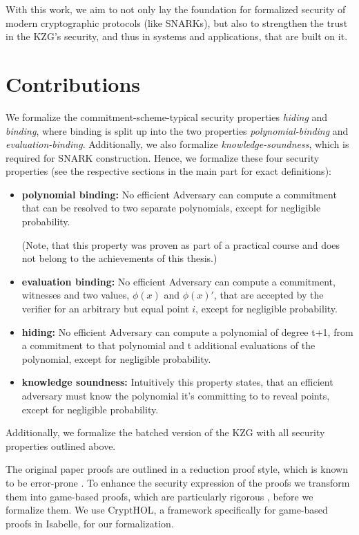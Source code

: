 With this work, we aim to not only lay the foundation for formalized security of modern cryptographic protocols (like SNARKs), but also to strengthen the trust in the KZG's security, and thus in systems and applications, that are built on it. 

\section{Contributions}

We formalize the commitment-scheme-typical security properties \textit{hiding} and \textit{binding}, where binding is split up into the two properties \textit{polynomial-binding} and \textit{evaluation-binding}. Additionally, we also formalize \textit{knowledge-soundness}, which is required for SNARK construction. Hence, we formalize these four security properties (see the respective sections in the main part for exact definitions):
\begin{itemize}
    \item \textbf{polynomial binding:}
    No efficient Adversary can compute a commitment that can be resolved to two separate polynomials, except for negligible probability.

    (Note, that this property was proven as part of a practical course and does not belong to the achievements of this thesis.)
    \item \textbf{evaluation binding:}
    No efficient Adversary can compute a commitment, witnesses and two values, $\phi(x)$ and $\phi(x)'$, that are accepted by the verifier for an arbitrary but equal point $i$, except for negligible probability.
    \item \textbf{hiding:}
    No efficient Adversary can compute a polynomial of degree t+1, from a commitment to that polynomial and t additional evaluations of the polynomial, except for negligible probability.
    \item \textbf{knowledge soundness:}
    Intuitively this property states, that an efficient adversary must know the polynomial it's committing to to reveal points, except for negligible probability. 
\end{itemize} 
Additionally, we formalize the batched version of the KZG with all security properties outlined above.  

The original paper proofs are outlined in a reduction proof style, which is known to be error-prone \parencite{gamesB&R}. To enhance the security expression of the proofs we transform them into game-based proofs, which are particularly rigorous \parencite{shoup_games, gamesB&R}, before we formalize them. We use CryptHOL, a framework specifically for game-based proofs in Isabelle, for our formalization. 


